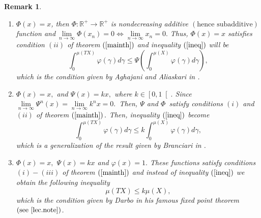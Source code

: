 \documentclass{amsart}
\theoremstyle{plain}
\newtheorem{remark}{Remark}
\numberwithin{equation}{section}
\begin{document}
\begin{remark}

\begin{enumerate}
\item[$\left( i\right) $] $\Phi \left( x\right) =x$, then $\Phi :\mathbb{R}^{+}\rightarrow \mathbb{R}^{+}$ is nondecreasing additive $\left( \text{hence subadditive}\right) $ function and$\ \lim\limits_{n\rightarrow \infty
}\Phi \left( x_{n}\right) =0\Leftrightarrow \lim\limits_{n\rightarrow \infty
}x_{n}=0.$ Thus, $\Phi \left( x\right) =x$ satisfies condition $\left(
ii\right) $ of theorem $\left( \text{\ref{mainth}}\right) $ and inequality $\left( \text{\ref{ineq}}\right) $ will be\begin{equation*}
\int_{0}^{\mu \left( TX\right) }\varphi \left( \gamma \right) d\gamma
\leqslant \Psi \left( \int_{0}^{\mu \left( X\right) }\varphi \left( \gamma
\right) d\gamma \right) ,
\end{equation*}which is the condition given by Aghajani and Aliaskari in \cite{agha}.

\item[$\left( ii\right) $] $\Phi \left( x\right) =x,$ and $\Psi \left(
x\right) =kx,$ where $k\in \left[ 0,1\right[ .$ Since $\lim\limits_{n\rightarrow \infty }\Psi ^{n}\left( x\right) =\lim\limits_{n\rightarrow
\infty }k^{n}x=0.$\ Then, $\Psi $ and $\Phi $\ satisfy conditions $\left(
i\right) $ and $\left( ii\right) $ of theorem $\left( \text{\ref{mainth}}\right) .$ Then, inequality $\left( \text{\ref{ineq}}\right) $ become 
\begin{equation*}
\int_{0}^{\mu \left( TX\right) }\varphi \left( \gamma \right) d\gamma
\leqslant k\int_{0}^{\mu \left( X\right) }\varphi \left( \gamma \right)
d\gamma ,
\end{equation*}which is a generalization of the result given by Branciari in \cite{branc}.

\item[$\left( iii\right) $] $\Phi \left( x\right) =x,$ $\Psi \left( x\right)
=kx$ and $\varphi \left( x\right) =1.$ These functions satisfy conditions $\left( i\right) -\left( iii\right) $ of theorem $\left( \text{\ref{mainth}}\right) $ and instead of inequality $\left( \text{\ref{ineq}}\right) $ we
obtain the following inequality\begin{equation*}
\mu \left( TX\right) \leqslant k\mu \left( X\right) ,
\end{equation*}which is the condition given by Darbo in his famous fixed point theorem $\left( \text{see \cite{lec.note}}\right) $.
\end{enumerate}
\end{remark}
\end{document}
